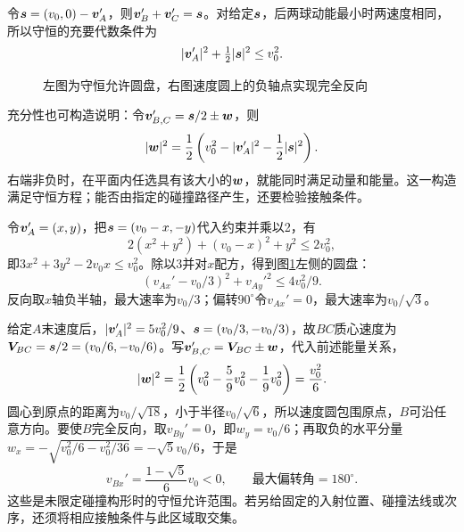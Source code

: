 \begin{solution}
令$\bm{s}=(v_0,0)-\bm{v}_A'$，则$\bm{v}_B'+\bm{v}_C'=\bm{s}$。对给定$\bm{s}$，后两球动能最小时两速度相同，所以守恒的充要代数条件为
\[
 |\bm{v}_A'|^2+\tfrac12|\bm{s}|^2\le v_0^2.
\]

\begin{figure}[H]\centering
{}
\caption{左图为守恒允许圆盘，右图速度圆上的负轴点实现完全反向}\label{fig:hw5-7-s}
\end{figure}

充分性也可构造说明：令$\bm{v}_{B,C}'=\bm{s}/2\pm\bm{w}$，则
\[
 |\bm{w}|^2=\frac12\left(v_0^2-|\bm{v}_A'|^2-\frac12|\bm{s}|^2\right).
\]
右端非负时，在平面内任选具有该大小的$\bm{w}$，就能同时满足动量和能量。这一构造满足守恒方程；能否由指定的碰撞路径产生，还要检验接触条件。

令$\bm{v}_A'=(x,y)$，把$\bm{s}=(v_0-x,-y)$代入约束并乘以2，有
\[
2(x^2+y^2)+(v_0-x)^2+y^2\le2v_0^2,
\]
即$3x^2+3y^2-2v_0x\le v_0^2$。除以3并对$x$配方，得到图\ref{fig:hw5-7-s}左侧的圆盘：
\[
 \boxed{(v_{Ax}'-v_0/3)^2+v_{Ay}'^2\le4v_0^2/9}.
\]
反向取$x$轴负半轴，最大速率为$\boxed{v_0/3}$；偏转$90^\circ$令$v_{Ax}'=0$，最大速率为$\boxed{v_0/\sqrt3}$。

给定$A$末速度后，$|\bm{v}_A'|^2=5v_0^2/9$、$\bm{s}=(v_0/3,-v_0/3)$，故$BC$质心速度为$\bm{V}_{BC}=\bm{s}/2=(v_0/6,-v_0/6)$。写$\bm{v}_{B,C}'=\bm{V}_{BC}\pm\bm{w}$，代入前述能量关系，
\[
|\bm{w}|^2=\frac12\left(v_0^2-\frac59v_0^2-\frac19v_0^2\right)
=\frac{v_0^2}{6}.
\]
圆心到原点的距离为$v_0/\sqrt{18}$，小于半径$v_0/\sqrt6$，所以速度圆包围原点，$B$可沿任意方向。要使$B$完全反向，取$v_{By}'=0$，即$w_y=v_0/6$；再取负的水平分量
$w_x=-\sqrt{v_0^2/6-v_0^2/36}=-\sqrt5v_0/6$，于是
\[
 v_{Bx}'=\frac{1-\sqrt5}{6}v_0<0,
 \qquad\boxed{\text{最大偏转角}=180^\circ}.
\]
这些是未限定碰撞构形时的守恒允许范围。若另给固定的入射位置、碰撞法线或次序，还须将相应接触条件与此区域取交集。


\end{solution}



